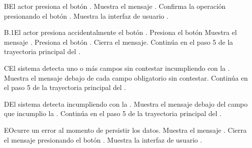     \begin{UCtrayectoriaA}{B}{El actor presiona el botón .}
    	\UCpaso Muestra el mensaje .
    	\UCpaso[\UCactor] Confirma la operación presionando el botón .
    	\UCpaso Muestra la interfaz de usuario .
    \end{UCtrayectoriaA}
    
    \begin{UCtrayectoriaA}{B.1}{El actor presiona accidentalmente el botón .}
    	\UCpaso[\UCactor] Presiona el botón 
    	\UCpaso Muestra el mensaje .
    	\UCpaso[\UCactor] Presiona el botón .
    	\UCpaso Cierra el mensaje.
    	\UCpaso Continúa en el paso 5 de la trayectoria principal del .
    \end{UCtrayectoriaA}
    
    \begin{UCtrayectoriaA}{C}{El sistema detecta uno o más campos sin contestar incumpliendo con la .}
    	\UCpaso Muestra el mensaje debajo de cada campo obligatorio sin contestar.
    	\UCpaso Continúa en el paso 5 de la trayectoria principal del .
    \end{UCtrayectoriaA}
    
    \begin{UCtrayectoriaA}{D}{El sistema detecta incumpliendo con la .}
    	\UCpaso Muestra el mensaje  debajo del campo que incumplio la .
    	\UCpaso Continúa en el paso 5 de la trayectoria principal del .
    \end{UCtrayectoriaA}
    
    \begin{UCtrayectoriaA}{E}{Ocurre un error al momento de persistir los datos.}
    	\UCpaso Muestra el mensaje .
    	\UCpaso[\UCactor] Cierra el mensaje presionando el botón .
    	\UCpaso Muestra la interfaz de usuario .
    \end{UCtrayectoriaA}

